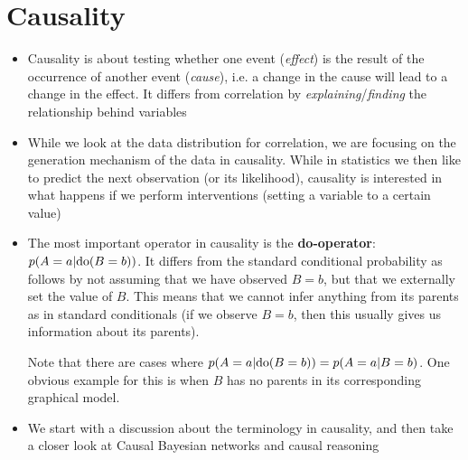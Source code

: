 \section{Causality}
\begin{itemize}
	\item Causality is about testing whether one event (\textit{effect}) is the result of the occurrence of another event (\textit{cause}), i.e. a change in the cause will lead to a change in the effect. It differs from correlation by \textit{explaining}/\textit{finding} the relationship behind variables
	\item While we look at the data distribution for correlation, we are focusing on the generation mechanism of the data in causality. While in statistics we then like to predict the next observation (or its likelihood), causality is interested in what happens if we perform interventions (setting a variable to a certain value)
	\item The most important operator in causality is the \textbf{do-operator}: $p(A=a|\textnormal{do}(B=b))$. It differs from the standard conditional probability as follows by not assuming that we have observed $B=b$, but that we externally set the value of $B$. This means that we cannot infer anything from its parents as in standard conditionals (if we observe $B=b$, then this usually gives us information about its parents).
	
	Note that there are cases where $p(A=a|\textnormal{do}(B=b))=p(A=a|B=b)$. One obvious example for this is when $B$ has no parents in its corresponding graphical model.
	\item We start with a discussion about the terminology in causality, and then take a closer look at Causal Bayesian networks and causal reasoning
\end{itemize}

